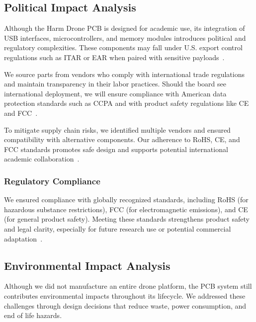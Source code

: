 \documentclass[12pt]{article}
\begin{document}
\subsection{Political Impact Analysis}

\par Although the Harm Drone PCB is designed for academic use, its integration of USB interfaces, microcontrollers, and memory modules introduces political and regulatory complexities. These components may fall under U.S. export control regulations such as ITAR or EAR when paired with sensitive payloads~\cite{itar}.

\par We source parts from vendors who comply with international trade regulations and maintain transparency in their labor practices. Should the board see international deployment, we will ensure compliance with American data protection standards such as CCPA and with product safety regulations like CE and FCC~\cite{ti2023b,microchip2023}.

\par To mitigate supply chain risks, we identified multiple vendors and ensured compatibility with alternative components. Our adherence to RoHS, CE, and FCC standards promotes safe design and supports potential international academic collaboration~\cite{ti2023b}.

\subsubsection{Regulatory Compliance}

\par We ensured compliance with globally recognized standards, including RoHS (for hazardous substance restrictions), FCC (for electromagnetic emissions), and CE (for general product safety). Meeting these standards strengthens product safety and legal clarity, especially for future research use or potential commercial adaptation~\cite{ti2023b}.

\subsection{Environmental Impact Analysis}

\par Although we did not manufacture an entire drone platform, the PCB system still contributes environmental impacts throughout its lifecycle. We addressed these challenges through design decisions that reduce waste, power consumption, and end of life hazards.
\end{document}
